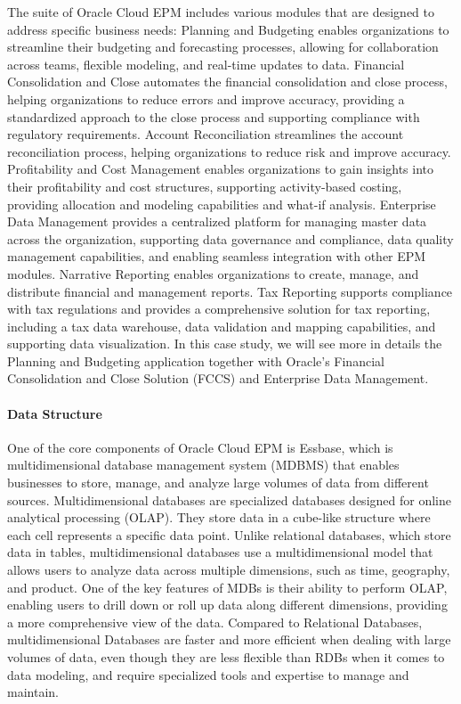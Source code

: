 \documentclass[12pt,a4paper,openright,twoside]{book}
\begin{document}
The suite of Oracle Cloud EPM includes various modules that are designed to address specific business needs:
%
Planning and Budgeting enables organizations to streamline their budgeting and forecasting processes, allowing for collaboration across teams, flexible modeling, and real-time updates to data.
%
Financial Consolidation and Close automates the financial consolidation and close process, helping organizations to reduce errors and improve accuracy, providing a standardized approach to the close process and supporting compliance with regulatory requirements.
%
Account Reconciliation streamlines the account reconciliation process, helping organizations to reduce risk and improve accuracy. 
%
Profitability and Cost Management enables organizations to gain insights into their profitability and cost structures, supporting activity-based costing, providing allocation and modeling capabilities and what-if analysis.
%
Enterprise Data Management provides a centralized platform for managing master data across the organization, supporting data governance and compliance, data quality management capabilities, and enabling seamless integration with other EPM modules.
%
Narrative Reporting enables organizations to create, manage, and distribute financial and management reports.
%
Tax Reporting supports compliance with tax regulations and provides a comprehensive solution for tax reporting, including a tax data warehouse, data validation and mapping capabilities, and supporting data visualization.
%
In this case study, we will see more in details the Planning and Budgeting application together with Oracle's Financial Consolidation and Close Solution (FCCS) and Enterprise Data Management.

\paragraph{Data Structure}

One of the core components of Oracle Cloud EPM is Essbase, which is multidimensional database management system (MDBMS) that enables businesses to store, manage, and analyze large volumes of data from different sources.
%
Multidimensional databases are specialized databases designed for online analytical processing (OLAP). 
%
They store data in a cube-like structure where each cell represents a specific data point.
%
Unlike relational databases, which store data in tables, multidimensional databases use a multidimensional model that allows users to analyze data across multiple dimensions, such as time, geography, and product. 
%
One of the key features of MDBs is their ability to perform OLAP, enabling users to drill down or roll up data along different dimensions, providing a more comprehensive view of the data. 
%
Compared to Relational Databases, multidimensional Databases are faster and more efficient when dealing with large volumes of data, even though they are less flexible than RDBs when it comes to data modeling, and require specialized tools and expertise to manage and maintain.
\end{document}
